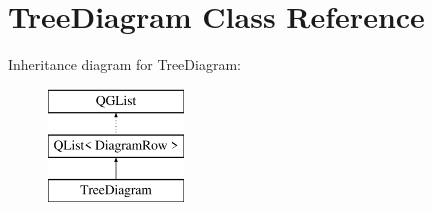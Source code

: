 \hypertarget{class_tree_diagram}{}\section{Tree\+Diagram Class Reference}
\label{class_tree_diagram}
Inheritance diagram for Tree\+Diagram\+:\begin{figure}[H]
\begin{center}
\leavevmode
\includegraphics[height=3.000000cm]{class_tree_diagram}
\end{center}
\end{figure}
